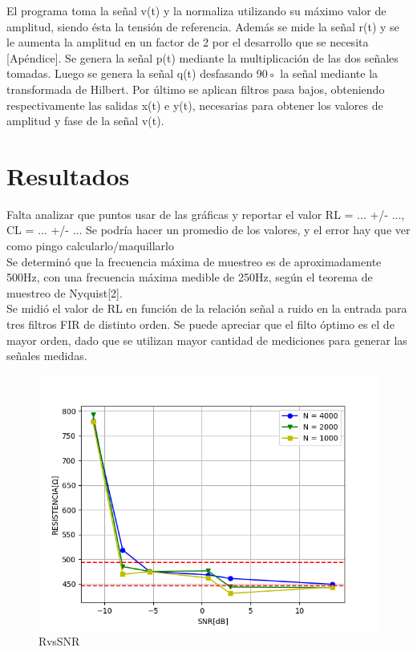 \documentclass[11pt,a4paper]{extarticle}
\begin{document}
\begin{multicols}{2}
El programa toma la señal v(t)
y la normaliza utilizando su máximo valor de amplitud,
 siendo ésta la tensión de referencia. Además se mide 
 la señal r(t) y se le aumenta la amplitud en un factor
 de 2 por el desarrollo que se necesita [Apéndice].
Se genera la señal p(t) mediante la multiplicación de 
las dos señales tomadas.
Luego se genera la señal q(t) desfasando 90◦
la señal 
mediante la transformada de Hilbert.
Por último se aplican filtros pasa bajos,
 obteniendo respectivamente las salidas x(t) e y(t),
  necesarias para obtener los
valores de amplitud y fase de la señal v(t).


\section{Resultados}

Falta analizar que puntos usar de las gráficas y reportar
el valor RL = ... +/- ..., CL = ... +/- ...
Se podría hacer un promedio de los valores, y el error hay 
que ver como pingo calcularlo/maquillarlo\\
Se determinó que la frecuencia máxima de muestreo es 
de aproximadamente 
500Hz, con una frecuencia máxima medible de 250Hz, 
según el teorema de muestreo de Nyquist[2].\\

Se midió el valor de RL en función 
de la relación señal a ruido en la entrada para tres 
filtros FIR de distinto orden.
Se puede apreciar que el filto óptimo es el de mayor 
orden, dado que se utilizan mayor cantidad de 
mediciones para generar las señales medidas.

\begin{figure}[H]
	\centering
	\includegraphics[width=\linewidth]{Images/RvsSNR(segunda).png}
	\caption{RvsSNR}
	\label{fig:RvsSNR}
\end{figure}


\end{multicols}
\end{document}
